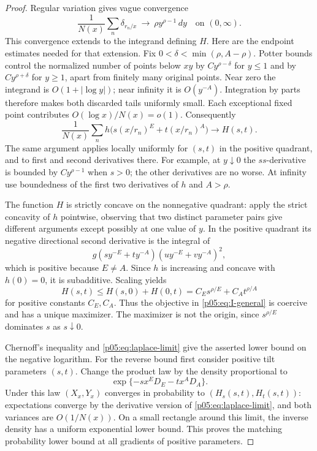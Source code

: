 \documentclass[11pt,letterpaper]{article}
\theoremstyle{definition}
\theoremstyle{remark}
\newcommand{\1}{\mathbf 1}
\begin{document}
\begin{proof}
Regular variation gives vague convergence
\[
 \frac{1}{N(x)}\sum_n\delta_{r_n/x}
 \ \longrightarrow\ \rho y^{\rho-1}\,dy
 \quad\text{on }(0,\infty).
\]
This convergence extends to the integrand defining $H$.
Here are the endpoint estimates needed for that extension. Fix
$0<\delta<\min(\rho,A-\rho)$. Potter bounds control the normalized number
of points below $xy$ by $C y^{\rho-\delta}$ for $y\le1$ and by
$C y^{\rho+\delta}$ for $y\ge1$, apart from finitely many original
points. Near zero the integrand is $O(1+|\log y|)$; near infinity it
is $O(y^{-A})$. Integration by parts therefore makes both discarded
tails uniformly small. Each exceptional fixed point contributes
$O(\log x)/N(x)=o(1)$. Consequently
\begin{equation}\label{p05:eq:laplace-limit}
 \frac{1}{N(x)}\sum_n h\bigl(s(x/r_n)^E+t(x/r_n)^A\bigr)
 \longrightarrow H(s,t).
\end{equation}
The same argument applies locally uniformly for $(s,t)$ in the positive
quadrant, and to first and second derivatives there. For example, at
$y\downarrow0$ the $ss$-derivative is bounded by $C y^{\rho-1}$ when
$s>0$; the other derivatives are no worse. At infinity use boundedness
of the first two derivatives of $h$ and $A>\rho$.

The function $H$ is strictly concave on the nonnegative quadrant:
apply the strict concavity of $h$ pointwise, observing that two distinct
parameter pairs give different arguments except possibly at one value
of $y$. In the positive quadrant its negative directional second
derivative is the integral of
\[
 g(sy^{-E}+ty^{-A})(u y^{-E}+v y^{-A})^2,
\]
which is positive because $E\ne A$. Since $h$ is increasing and concave
with $h(0)=0$, it is subadditive. Scaling yields
\[
 H(s,t)\le H(s,0)+H(0,t)=C_Es^{\rho/E}+C_At^{\rho/A}
\]
for positive constants $C_E,C_A$. Thus the objective in
\eqref{p05:eq:I-general} is coercive and has a unique maximizer. The
maximizer is not the origin, since $s^{\rho/E}$ dominates $s$ as
$s\downarrow0$.

Chernoff's inequality and \eqref{p05:eq:laplace-limit} give the asserted
lower bound on the negative logarithm. For the reverse bound first
consider positive tilt parameters $(s,t)$. Change the product law by
the density proportional to
\[
 \exp\{-s x^E D_E-t x^A D_A\}.
\]
Under this law $(X_x,Y_x)$ converges in probability to
$(H_s(s,t),H_t(s,t))$: expectations converge by the derivative version
of \eqref{p05:eq:laplace-limit}, and both variances are $O(1/N(x))$.
On a small rectangle around this limit, the inverse density has a
uniform exponential lower bound. This proves the matching probability
lower bound at all gradients of positive parameters.


\end{proof}
\end{document}
